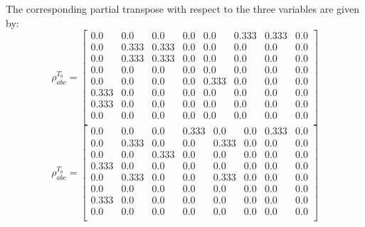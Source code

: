 \documentclass{scrartcl}
\begin{document}
    The corresponding partial transpose with respect to the three variables are given by:
    \begin{equation*}
        \rho^{T_a}_{abc} =
        \left[
        \begin{array}{cccccccc}
        0.0 & 0.0 & 0.0 & 0.0 & 0.0 & 0.333 & 0.333 & 0.0 \\
        0.0 & 0.333 & 0.333 & 0.0 & 0.0 & 0.0 & 0.0 & 0.0 \\
        0.0 & 0.333 & 0.333 & 0.0 & 0.0 & 0.0 & 0.0 & 0.0 \\
        0.0 & 0.0 & 0.0 & 0.0 & 0.0 & 0.0 & 0.0 & 0.0 \\
        0.0 & 0.0 & 0.0 & 0.0 & 0.333 & 0.0 & 0.0 & 0.0 \\
        0.333 & 0.0 & 0.0 & 0.0 & 0.0 & 0.0 & 0.0 & 0.0 \\
        0.333 & 0.0 & 0.0 & 0.0 & 0.0 & 0.0 & 0.0 & 0.0 \\
        0.0 & 0.0 & 0.0 & 0.0 & 0.0 & 0.0 & 0.0 & 0.0 \\
        \end{array}
        \right]
        \end{equation*}
        \begin{equation*}
            \rho^{T_b}_{abc}=
            \left[
            \begin{array}{cccccccc}
            0.0 & 0.0 & 0.0 & 0.333 & 0.0 & 0.0 & 0.333 & 0.0 \\
            0.0 & 0.333 & 0.0 & 0.0 & 0.333 & 0.0 & 0.0 & 0.0 \\
            0.0 & 0.0 & 0.333 & 0.0 & 0.0 & 0.0 & 0.0 & 0.0 \\
            0.333 & 0.0 & 0.0 & 0.0 & 0.0 & 0.0 & 0.0 & 0.0 \\
            0.0 & 0.333 & 0.0 & 0.0 & 0.333 & 0.0 & 0.0 & 0.0 \\
            0.0 & 0.0 & 0.0 & 0.0 & 0.0 & 0.0 & 0.0 & 0.0 \\
            0.333 & 0.0 & 0.0 & 0.0 & 0.0 & 0.0 & 0.0 & 0.0 \\
            0.0 & 0.0 & 0.0 & 0.0 & 0.0 & 0.0 & 0.0 & 0.0 \\
            \end{array}
            \right]
            \end{equation*}
\end{document}
